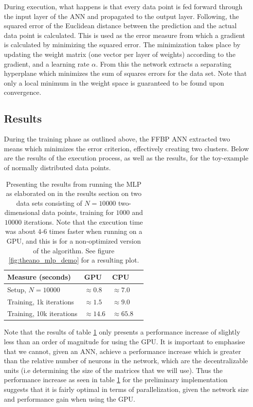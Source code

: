 During execution, what happens is that every data point is fed forward through the input layer of the ANN and propagated to the output layer. Following, the squared error of the Euclidean distance between the prediction and the actual data point is calculated. This is used as the error measure from which a gradient is calculated by minimizing the squared error. The minimization takes place by updating the weight matrix (one vector per layer of weights) according to the gradient, and a learning rate $\alpha$. From this the network extracts a separating hyperplane which minimizes the sum of squares errors for the data set. Note that only a local minimum in the weight space is guaranteed to be found upon convergence.

\subsection{Results}

During the training phase as outlined above, the FFBP ANN extracted two means which minimizes the error criterion, effectively creating two clusters. Below are the results of the execution process, as well as the results, for the toy-example of normally distributed data points.


\begin{table}
\begin{center}
    \begin{tabular}{ | l | l | l | l |}
    \hline
    \textbf{Measure (seconds)} & \textbf{GPU} & \textbf{CPU} \\ \hline
     Setup, $N=10 000$ & $\approx0.8$ & $\approx7.0$ \\ \hline
     Training, 1k iterations &  $\approx1.5$ & $\approx9.0$ \\ \hline
     Training, 10k iterations &  $\approx14.6$ & $\approx65.8$ \\ \hline
    \end{tabular}
\end{center}
\caption{Presenting the results from running the MLP as elaborated on in the results section on two data sets consisting of $N=10 000$ two-dimensional data points, training for $1000$ and $10 000$ iterations. Note that the execution time was about 4-6 times faster when running on a GPU, and this is for a non-optimized version of the algorithm. See figure \ref{fig:theano_mlp_demo} for a resulting plot.}
\label{tab:MLP_gpu_vs_cpu}
\end{table}

Note that the results of table \ref{tab:MLP_gpu_vs_cpu} only presents a performance increase of slightly less than an order of magnitude for using the GPU. It is important to emphasise that we cannot, given an ANN, achieve a performance increase which is greater than the relative number of neurons in the network, which are the decentralizable units (i.e determining the size of the matrices that we will use). Thus the performance increase as seen in table \ref{tab:MLP_gpu_vs_cpu} for the preliminary implementation suggests that it is fairly optimal in terms of parallelization, given the network size and performance gain when using the GPU.

